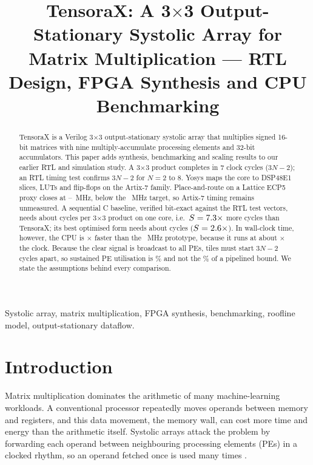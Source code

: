 \documentclass[conference]{IEEEtran}
\newcommand{\tx}{TensoraX\xspace}
\begin{document}
\title{TensoraX: A 3$\times$3 Output-Stationary Systolic Array for Matrix Multiplication --- RTL Design, FPGA Synthesis and CPU Benchmarking}

\author{
}

\maketitle

\begin{abstract}
\tx is a Verilog 3$\times$3 output-stationary systolic array that multiplies signed 16-bit matrices with nine multiply-accumulate processing elements and 32-bit accumulators. This paper adds synthesis, benchmarking and scaling results to our earlier RTL and simulation study. A 3$\times$3 product completes in 7 clock cycles ($3N-2$); an RTL timing test confirms $3N-2$ for $N=2$ to $8$. Yosys maps the core to \XDsp DSP48E1 slices, \XLut LUTs and \XFF flip-flops on the Artix-7 family. Place-and-route on a Lattice ECP5 proxy closes at \FmaxLo--\FmaxHi~MHz, below the \FTarget~MHz target, so Artix-7 timing remains unmeasured. A sequential C baseline, verified bit-exact against the RTL test vectors, needs about \HeadCyc cycles per 3$\times$3 product on one \CpuName core, i.e.\ $S=7.3\times$ more cycles than \tx; its best optimised form needs about \BestCyc cycles ($S=2.6\times$). In wall-clock time, however, the CPU is \CpuFasterHead{}$\times$ faster than the \FmaxLoShort~MHz prototype, because it runs at about \ClockRatio{}$\times$ the clock. Because the clear signal is broadcast to all PEs, tiles must start $3N-2$ cycles apart, so sustained PE utilisation is \EtaThree{}\% and not the \EtaBatchHundred{}\% of a pipelined bound. We state the assumptions behind every comparison.
\end{abstract}

\begin{IEEEkeywords}
Systolic array, matrix multiplication, FPGA synthesis, benchmarking, roofline model, output-stationary dataflow.
\end{IEEEkeywords}

\section{Introduction}
Matrix multiplication dominates the arithmetic of many machine-learning workloads. A conventional processor repeatedly moves operands between memory and registers, and this data movement, the memory wall, can cost more time and energy than the arithmetic itself. Systolic arrays attack the problem by forwarding each operand between neighbouring processing elements (PEs) in a clocked rhythm, so an operand fetched once is used many times \cite{kung1982,kungleiserson}.
\end{document}
